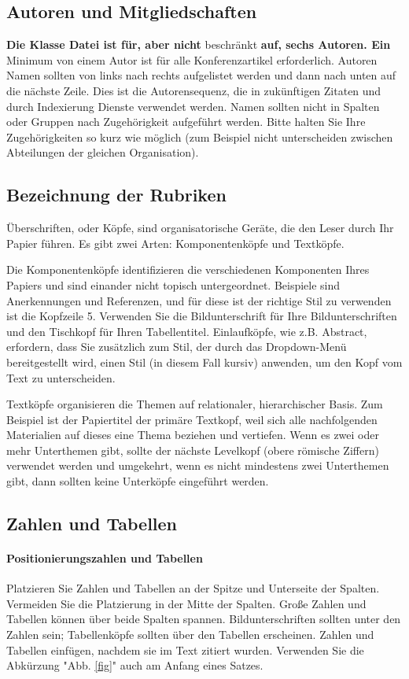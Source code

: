 \documentclass[conference]{IEEEtran}
\begin{document}
\subsection{Autoren und Mitgliedschaften}
\textbf{Die Klasse Datei ist für, aber nicht} beschränkt \textbf{auf, sechs Autoren. Ein} Minimum von einem Autor ist für alle Konferenzartikel erforderlich. Autoren Namen sollten von links nach rechts aufgelistet werden und dann nach unten auf die nächste Zeile. Dies ist die Autorensequenz, die in zukünftigen Zitaten und durch Indexierung Dienste verwendet werden. Namen sollten nicht in Spalten oder Gruppen nach Zugehörigkeit aufgeführt werden. Bitte halten Sie Ihre Zugehörigkeiten so kurz wie möglich (zum Beispiel nicht unterscheiden zwischen Abteilungen der gleichen Organisation).

\subsection{Bezeichnung der Rubriken}
Überschriften, oder Köpfe, sind organisatorische Geräte, die den Leser durch Ihr Papier führen. Es gibt zwei Arten: Komponentenköpfe und Textköpfe.

Die Komponentenköpfe identifizieren die verschiedenen Komponenten Ihres Papiers und sind einander nicht topisch untergeordnet. Beispiele sind Anerkennungen und Referenzen, und für diese ist der richtige Stil zu verwenden ist die Kopfzeile 5. Verwenden Sie die Bildunterschrift für Ihre Bildunterschriften und den Tischkopf für Ihren Tabellentitel. Einlaufköpfe, wie z.B. Abstract, erfordern, dass Sie zusätzlich zum Stil, der durch das Dropdown-Menü bereitgestellt wird, einen Stil (in diesem Fall kursiv) anwenden, um den Kopf vom Text zu unterscheiden.

Textköpfe organisieren die Themen auf relationaler, hierarchischer Basis. Zum Beispiel ist der Papiertitel der primäre Textkopf, weil sich alle nachfolgenden Materialien auf dieses eine Thema beziehen und vertiefen. Wenn es zwei oder mehr Unterthemen gibt, sollte der nächste Levelkopf (obere römische Ziffern) verwendet werden und umgekehrt, wenn es nicht mindestens zwei Unterthemen gibt, dann sollten keine Unterköpfe eingeführt werden.

\subsection{Zahlen und Tabellen}
\paragraph{Positionierungszahlen und Tabellen} Platzieren Sie Zahlen und Tabellen an der Spitze und Unterseite der Spalten. Vermeiden Sie die Platzierung in der Mitte der Spalten. Große Zahlen und Tabellen können über beide Spalten spannen. Bildunterschriften sollten unter den Zahlen sein; Tabellenköpfe sollten über den Tabellen erscheinen. Zahlen und Tabellen einfügen, nachdem sie im Text zitiert wurden. Verwenden Sie die Abkürzung "Abb. \ref{fig}" auch am Anfang eines Satzes.
\end{document}
